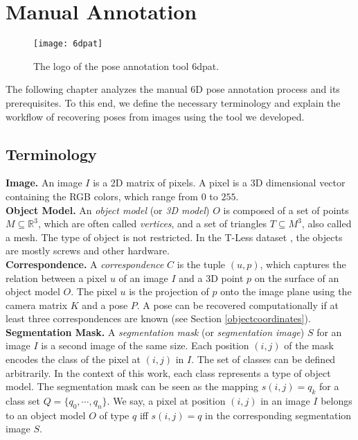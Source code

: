 \chapter{Manual Annotation} \label{chapter:manual_annotation}

\begin{figure}[!tbp]
	\centering
    \texttt{[image: 6dpat]}
    \caption{The logo of the pose annotation tool \ac{6dpat}.}
    	\label{fig:6dpat_logo}
\end{figure} 

The following chapter analyzes the manual 6D pose annotation process and its prerequisites. To this end, we define the necessary terminology and explain the workflow of recovering poses from images using the tool we developed. 

\section{Terminology} \label{section:terminology}

\textbf{Image.} An image $I$ is a 2D matrix of pixels. A pixel is a 3D dimensional vector containing the RGB colors, which range from $0$ to $255$. \\

\noindent\textbf{Object Model.} An \textit{object model} (or \textit{3D model}) $O$ is composed of a set of points $M \subseteq \mathbb{R}^3$, which are often called \textit{vertices}, and a set of triangles $T \subseteq M^3$, also called a mesh. The type of object is not restricted. In the T-Less dataset \cite{tless}, the objects are mostly screws and other hardware. \\

\noindent\textbf{Correspondence.} A \textit{correspondence} $C$ is the tuple $(u, p)$, which captures the relation between a pixel $u$ of an image $I$ and a 3D point $p$ on the surface of an object model $O$. The pixel $u$ is the projection of $p$ onto the image plane using the camera matrix $K$ and a pose $P$. A pose can be recovered computationally if at least three correspondences are known (see Section \ref{objectcoordinates}). \\

\noindent\textbf{Segmentation Mask.} A \textit{segmentation mask} (or \textit{segmentation image}) $S$ for an image $I$ is a second image of the same size. Each position $(i, j)$ of the mask encodes the class of the pixel at $(i, j)$ in $I$. The set of classes can be defined arbitrarily. In the context of this work, each class represents a type of object model. The segmentation mask can be seen as the mapping $s(i, j) = q_k$ for a class set $Q = \{q_0, \cdots, q_n\}$. We say, a pixel at position $(i, j)$ in an image $I$ belongs to an object model $O$ of type $q$ iff $s(i, j) = q$ in the corresponding segmentation image $S$. \\

